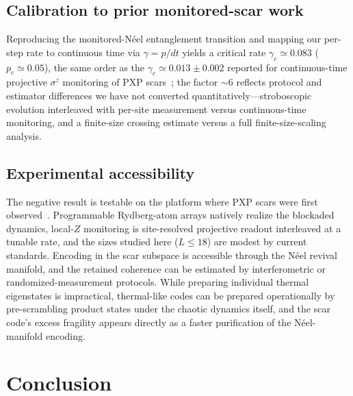 \documentclass[aps,prxquantum,twocolumn,superscriptaddress,floatfix,longbibliography]{revtex4-2}
\begin{document}
\subsection{Calibration to prior monitored-scar work}
Reproducing the monitored-N\'eel entanglement transition and mapping our
per-step rate to continuous time via $\gamma=p/dt$ yields a critical rate
$\gamma_c\simeq0.083$ ($p_c\simeq0.05$), the same order as the
$\gamma_c\simeq0.013\pm0.002$ reported for continuous-time projective
$\sigma^z$ monitoring of PXP scars~\cite{Paviglianiti2025}; the factor $\sim6$
reflects protocol and estimator differences we have not converted
quantitatively---stroboscopic evolution interleaved with per-site measurement
versus continuous-time monitoring, and a finite-size crossing estimate versus a
full finite-size-scaling analysis.

\subsection{Experimental accessibility}
The negative result is testable on the platform where PXP scars were first
observed~\cite{Bernien2017}. Programmable Rydberg-atom arrays natively realize
the blockaded dynamics, local-$Z$ monitoring is site-resolved projective
readout interleaved at a tunable rate, and the sizes studied here ($L\le18$)
are modest by current standards. Encoding in the scar subspace is accessible
through the N\'eel revival manifold, and the retained coherence can be
estimated by interferometric or randomized-measurement protocols. While
preparing individual thermal eigenstates is impractical, thermal-like codes can
be prepared operationally by pre-scrambling product states under the chaotic
dynamics itself, and the scar code's excess fragility appears directly as a
faster purification of the N\'eel-manifold encoding.

\section{Conclusion}
\end{document}
